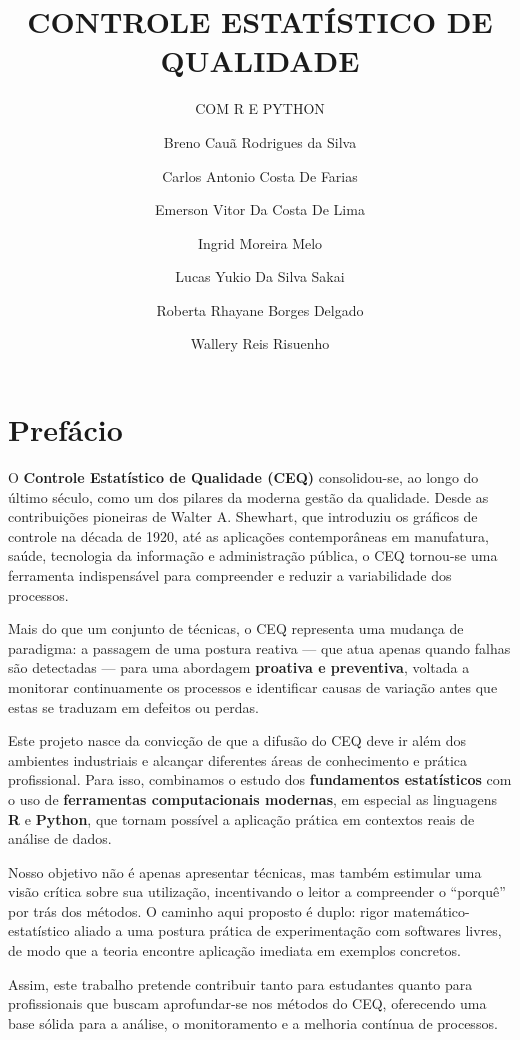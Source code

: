 \documentclass[
  portuguese,
  11pt,
  a4paper,
  DIV=11,
  numbers=noendperiod]{scrreprt}
\title{CONTROLE ESTATÍSTICO DE QUALIDADE}
\subtitle{COM R E PYTHON}
\author{Breno Cauã Rodrigues da Silva \and Carlos Antonio Costa De
Farias \and Emerson Vitor Da Costa De Lima \and Ingrid Moreira
Melo \and Lucas Yukio Da Silva Sakai \and Roberta Rhayane Borges
Delgado \and Wallery Reis Risuenho}
\date{}
\renewcommand*\contentsname{Índice}
\newcommand\contentsname{Índice}
\begin{document}
\maketitle

\renewcommand*\contentsname{Índice}
{
\hypersetup{linkcolor=}
\setcounter{tocdepth}{2}
\tableofcontents
}


\chapter*{Prefácio}\label{prefuxe1cio}


O \textbf{Controle Estatístico de Qualidade (CEQ)} consolidou-se, ao
longo do último século, como um dos pilares da moderna gestão da
qualidade. Desde as contribuições pioneiras de Walter A. Shewhart, que
introduziu os gráficos de controle na década de 1920, até as aplicações
contemporâneas em manufatura, saúde, tecnologia da informação e
administração pública, o CEQ tornou-se uma ferramenta indispensável para
compreender e reduzir a variabilidade dos processos.

Mais do que um conjunto de técnicas, o CEQ representa uma mudança de
paradigma: a passagem de uma postura reativa --- que atua apenas quando
falhas são detectadas --- para uma abordagem \textbf{proativa e
preventiva}, voltada a monitorar continuamente os processos e
identificar causas de variação antes que estas se traduzam em defeitos
ou perdas.

Este projeto nasce da convicção de que a difusão do CEQ deve ir além dos
ambientes industriais e alcançar diferentes áreas de conhecimento e
prática profissional. Para isso, combinamos o estudo dos
\textbf{fundamentos estatísticos} com o uso de \textbf{ferramentas
computacionais modernas}, em especial as linguagens \textbf{R} e
\textbf{Python}, que tornam possível a aplicação prática em contextos
reais de análise de dados.

Nosso objetivo não é apenas apresentar técnicas, mas também estimular
uma visão crítica sobre sua utilização, incentivando o leitor a
compreender o ``porquê'' por trás dos métodos. O caminho aqui proposto é
duplo: rigor matemático-estatístico aliado a uma postura prática de
experimentação com softwares livres, de modo que a teoria encontre
aplicação imediata em exemplos concretos.

Assim, este trabalho pretende contribuir tanto para estudantes quanto
para profissionais que buscam aprofundar-se nos métodos do CEQ,
oferecendo uma base sólida para a análise, o monitoramento e a melhoria
contínua de processos.
\end{document}
